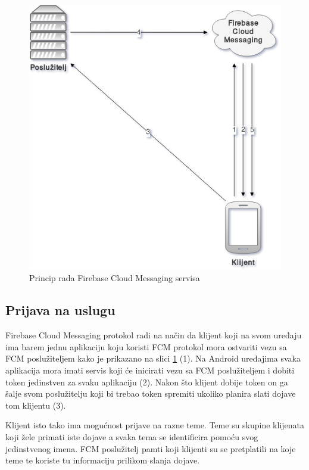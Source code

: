 \documentclass[times, utf8, zavrsni]{fer}
\begin{document}
\begin{figure}[htb]
\centering
\includegraphics[width=14cm]{img/fcm.png}
\caption{Princip rada Firebase Cloud Messaging servisa}
\label{fig:fcm-image}
\end{figure}

\subsection{Prijava na uslugu}
Firebase Cloud Messaging protokol radi na način da klijent koji na svom uređaju ima barem jednu aplikaciju koju koristi FCM protokol mora ostvariti vezu sa FCM poslužiteljem kako je prikazano na slici \ref{fig:fcm-image} (1). Na Android uređajima svaka aplikacija mora imati servis koji će inicirati vezu sa FCM poslužiteljem i dobiti token jedinstven za svaku aplikaciju (2). Nakon što klijent dobije token on ga šalje svom poslužitelju koji bi trebao token spremiti ukoliko planira slati dojave tom klijentu (3). 

Klijent isto tako ima mogućnost prijave na razne teme. Teme su skupine klijenata koji žele primati iste dojave a svaka tema se identificira pomoću svog jedinstvenog imena. FCM poslužitelj pamti koji klijenti su se pretplatili na koje teme te koriste tu informaciju prilikom slanja dojave.
\end{document}

